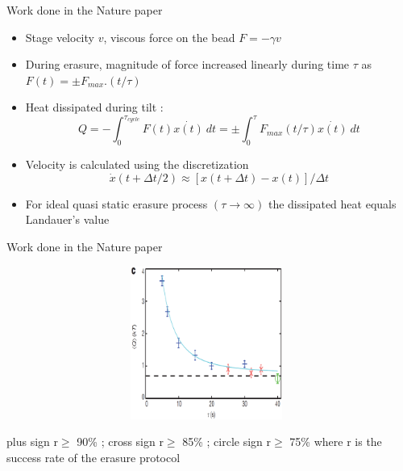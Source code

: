 \documentclass{beamer}
\begin{document}
\begin{frame}{Work done in the Nature paper}

\begin{itemize}

\item Stage velocity $v$, viscous force on the bead $F = -\gamma v$
\item During erasure, magnitude of force increased linearly during time $\tau$ as $F(t)=\pm F_{max} . (t/\tau)$
\item Heat dissipated during tilt :
\begin{equation*}
Q= -\int_{0}^{\tau_{cycle}} F(t)\dot{x(t)}~dt=\pm \int_{0}^{\tau} F_{max}(t/\tau)\dot{x(t)}~dt
\end{equation*}
\item Velocity is calculated using the discretization
\begin{equation*}
\dot{x}(t+\Delta t/2) \approx [x(t+\Delta t)-x(t)]/\Delta t
\end{equation*}
\item For ideal quasi static erasure process $(\tau \rightarrow \infty)$ the dissipated heat equals Landauer's value

\end{itemize}


\end{frame}

\begin{frame}{Work done in the Nature paper}
\begin{figure}
    \centering
    \includegraphics[height=5cm,width=11cm]{nature_landauer_fig4.eps}
    \label{fig:graph4}
\end{figure}
plus sign r$\geq$ 90\% ; cross sign r$\geq$ 85\% ; circle sign  r$\geq$ 75\% where r is the success rate of the erasure protocol

\end{frame}
\end{document}
